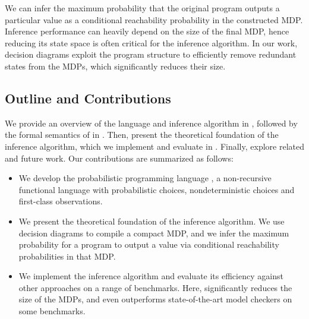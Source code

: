 We can infer the maximum probability that the original program outputs a particular value as a conditional reachability probability in the constructed MDP. 
Inference performance can heavily depend on the size of the final MDP, hence reducing its state space is often critical for the inference algorithm.
In our work, decision diagrams exploit the program structure to efficiently remove redundant states from the MDPs, which significantly reduces their size.
 


\subsection{Outline and Contributions}

We provide an overview of the \NDICE language and inference algorithm in , followed by the formal semantics of \NDICE in .
Then,  present the theoretical foundation of the inference algorithm, which we implement and evaluate in .
Finally,  explore related and future work.
Our contributions are summarized as follows:

\begin{itemize}
	\item We develop the probabilistic programming language \NDICE, a non-recursive functional language with probabilistic choices, nondeterministic choices and first-class observations.
	\item We present the theoretical foundation of the \NDICE inference algorithm. We use decision diagrams to compile a compact MDP, and we infer the maximum probability  for a \NDICE program to output a value via conditional reachability probabilities in that MDP.
	\item We implement the inference algorithm and evaluate its efficiency against other approaches on a range of benchmarks. 
	Here, \NDICE significantly reduces the size of the MDPs, and even outperforms state-of-the-art model checkers on some benchmarks.
\end{itemize}



